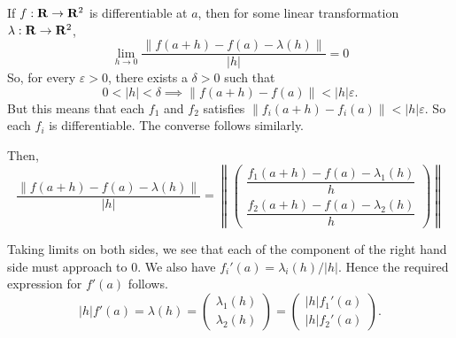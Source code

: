 \begin{solution}
    If $f:\mathbf{R}\to\mathbf{R}^2$ is differentiable
    at $a$, then for some linear
    transformation $\lambda:\mathbf{R}\to\mathbf{R}^2$,
    $$\lim_{h\to 0}
    {\frac{\|f(a+h)-f(a)-\lambda(h)\|}
    {\vert h\vert}}
    =0$$
    So, for every $\varepsilon>0$, there
    exists a $\delta>0$ such that
    $$0<\vert h\vert <\delta\implies
    \|f(a+h)-f(a)\|<
    \vert h\vert\varepsilon.$$
    But this means that each $f_1$ and
    $f_2$ satisfies
    $\|f_i(a+h)-f_i(a)\|<\vert h\vert
    \varepsilon.$ So each $f_i$ is
    differentiable. The converse follows
    similarly.

    Then,
    $$\frac{\|f(a+h)-f(a)-\lambda(h)\|}
    {\vert h\vert}=\left\lVert\left(
        \begin{matrix}
        \dfrac{f_1(a+h)-f(a)-\lambda_1(h)}
        {h}\\[6pt]
        \dfrac{f_2(a+h)-f(a)-\lambda_2(h)}
        {h}
        \end{matrix}\right)\right\rVert$$
    
    Taking limits on both sides,
    we see that each of the component
    of the right
    hand side must approach to
     $0$. We also have
    $f_i'(a)=\lambda_i(h)/\vert h\vert.$
    Hence the
    required expression for $f'(a)$
    follows.
    $$\vert h\vert f'(a)=
    \lambda(h) =
    \left(
    \begin{matrix}
        \lambda_1(h)\\[6pt]
        \lambda_2(h)
    \end{matrix}\right)
    =
    \left(
    \begin{matrix}
        \vert h\vert f_1'(a)\\[6pt]
        \vert h\vert f_2'(a)
    \end{matrix}\right).
    $$
\end{solution}